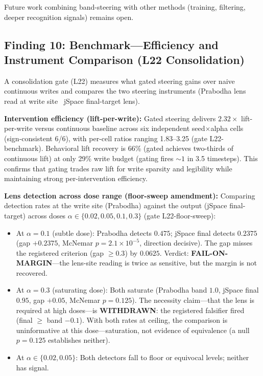 Future work combining band-steering with other methods (training, filtering, deeper recognition signals)
remains open.

\subsection*{Finding 10: Benchmark---Efficiency and Instrument Comparison (L22 Consolidation)}

A consolidation gate (L22) measures what gated steering gains over naive continuous writes and compares
the two steering instruments (Prabodha lens read at write site \vs\ jSpace final-target lens).

\textbf{Intervention efficiency (lift-per-write):} Gated steering delivers $2.32 \times$ lift-per-write
versus continuous baseline across six independent seed$\times$alpha cells (sign-consistent 6/6),
with per-cell ratios ranging 1.83--3.25 (gate L22-benchmark). Behavioral lift recovery is 66\%
(gated achieves two-thirds of continuous lift) at only 29\% write budget (gating fires $\sim 1$ in 3.5 timesteps).
This confirms that gating trades raw lift for write sparsity and legibility while maintaining strong per-intervention efficiency.

\textbf{Lens detection across dose range (floor-sweep amendment):} Comparing detection rates at the write site
(Prabodha) against the output (jSpace final-target) across doses $\alpha \in \{0.02, 0.05, 0.1, 0.3\}$
(gate L22-floor-sweep):
\begin{itemize}
  \item At $\alpha=0.1$ (subtle dose): Prabodha detects $0.475$; jSpace final detects $0.2375$ (gap $+0.2375$, McNemar $p=2.1 \times 10^{-5}$, direction decisive). The gap misses the registered criterion (gap $\ge 0.3$) by $0.0625$. Verdict: \textbf{FAIL-ON-MARGIN}---the lens-site reading is twice as sensitive, but the margin is not recovered.
  \item At $\alpha=0.3$ (saturating dose): Both saturate (Prabodha band $1.0$, jSpace final $0.95$, gap $+0.05$, McNemar $p=0.125$). The necessity claim---that the lens is required at high doses---is \textbf{WITHDRAWN}: the registered falsifier fired (final $\ge$ band $- 0.1$). With both rates at ceiling, the comparison is uninformative at this dose---saturation, not evidence of equivalence (a null $p=0.125$ establishes neither).
  \item At $\alpha \in \{0.02, 0.05\}$: Both detectors fall to floor or equivocal levels; neither has signal.
\end{itemize}

